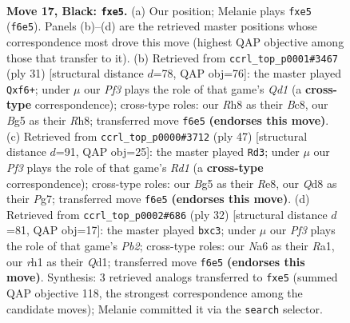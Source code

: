 \documentclass[11pt]{article}
\begin{document}
\clearpage

\begin{figure}[p]\centering
\begin{subfigure}{0.46\textwidth}\centering
\resizebox{\linewidth}{!}{%
\newchessgame
\chessboard[
  setfen={r2q3r/3p1k1p/n2P1p2/2p1P1b1/P5P1/2N5/1P6/R2QK1NR b KQ - 0 17},
  showmover=false,
  pgfstyle=straightmove, color=movearrow, markmove={f6-e5}
]}
\caption{}
\end{subfigure}\hfill
\begin{subfigure}{0.46\textwidth}\centering
\resizebox{\linewidth}{!}{%
\newchessgame
\chessboard[
  setfen={2bq3r/1ppp1kpp/2n2P2/p7/8/5Q2/PK3PPP/3R2NR b - - 0 16},
  showmover=false,
  pgfstyle=straightmove, color=movearrow, markmove={d8-f6}
]}
\caption{}
\end{subfigure}
\\[4pt]
\begin{subfigure}{0.46\textwidth}\centering
\resizebox{\linewidth}{!}{%
\newchessgame
\chessboard[
  setfen={3rr1k1/2p3pp/R3b3/1p2pq2/1P6/2P1Q2P/3N1PP1/4R1K1 b - - 0 24},
  showmover=false,
  pgfstyle=straightmove, color=movearrow, markmove={d8-d3}
]}
\caption{}
\end{subfigure}\hfill
\begin{subfigure}{0.46\textwidth}\centering
\resizebox{\linewidth}{!}{%
\newchessgame
\chessboard[
  setfen={r2q1r2/p1pp3k/np2p3/8/2P2P2/2b2R2/PP3PP1/R2Q1K2 w - - 0 17},
  showmover=false,
  pgfstyle=straightmove, color=movearrow, markmove={b2-c3}
]}
\caption{}
\end{subfigure}
\caption{\textbf{Move 17, Black: \texttt{fxe5}.} (a) Our position; Melanie plays \texttt{fxe5} (\texttt{f6e5}). Panels (b)--(d) are the retrieved master positions whose correspondence most drove this move (highest QAP objective among those that transfer to it). (b) Retrieved from \texttt{ccrl\_top\_p0001\#3467} (ply 31) [structural distance $d$=78, QAP obj=76]: the master played \texttt{Qxf6+}; under $\mu$ our \emph{Pf3} plays the role of that game's \emph{Qd1} (a \textbf{cross-type} correspondence); cross-type roles: our \emph{R}h8 as their \emph{B}c8, our \emph{B}g5 as their \emph{R}h8; transferred move \texttt{f6e5} \textbf{(endorses this move)}. (c) Retrieved from \texttt{ccrl\_top\_p0000\#3712} (ply 47) [structural distance $d$=91, QAP obj=25]: the master played \texttt{Rd3}; under $\mu$ our \emph{Pf3} plays the role of that game's \emph{Rd1} (a \textbf{cross-type} correspondence); cross-type roles: our \emph{B}g5 as their \emph{R}e8, our \emph{Q}d8 as their \emph{P}g7; transferred move \texttt{f6e5} \textbf{(endorses this move)}. (d) Retrieved from \texttt{ccrl\_top\_p0002\#686} (ply 32) [structural distance $d$=81, QAP obj=17]: the master played \texttt{bxc3}; under $\mu$ our \emph{Pf3} plays the role of that game's \emph{Pb2}; cross-type roles: our \emph{N}a6 as their \emph{R}a1, our \emph{r}h1 as their \emph{Q}d1; transferred move \texttt{f6e5} \textbf{(endorses this move)}. Synthesis: 3 retrieved analogs transferred to \texttt{fxe5} (summed QAP objective 118, the strongest correspondence among the candidate moves); Melanie committed it via the \texttt{search} selector.}
\label{fig:thought-m33}
\end{figure}
\end{document}
